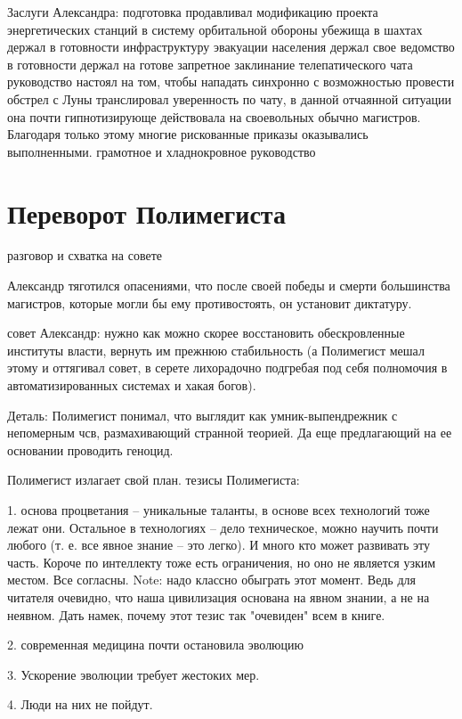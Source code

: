 \documentclass[12pt,a4paper]{article}
\begin{document}
Заслуги Александра:
подготовка
	продавливал модификацию проекта энергетических станций в систему орбитальной обороны
	убежища в шахтах
	держал в готовности инфраструктуру эвакуации населения
	держал свое ведомство в готовности
	держал на готове запретное заклинание телепатического чата
руководство
	настоял на том, чтобы нападать синхронно с возможностью провести обстрел с Луны
	транслировал уверенность по чату, в данной отчаянной ситуации она почти гипнотизирующе действовала на своевольных обычно магистров. Благодаря только этому многие рискованные приказы оказывались выполненными.
	грамотное и хладнокровное руководство
	
	



\section*{Переворот Полимегиста}
разговор и схватка на совете

Александр тяготился опасениями, что после своей победы и смерти большинства магистров, которые могли бы ему противостоять, он установит диктатуру. 

совет
Александр: нужно как можно скорее восстановить обескровленные институты власти, вернуть им прежнюю стабильность (а Полимегист мешал этому и оттягивал совет, в серете лихорадочно подгребая под себя полномочия в автоматизированных системах и хакая богов).

Деталь: Полимегист понимал, что выглядит как умник-выпендрежник с непомерным чсв, размахивающий странной теорией. Да еще предлагающий на ее основании проводить геноцид.

Полимегист излагает свой план.
тезисы Полимегиста:

1. основа процветания -- уникальные таланты, в основе всех технологий тоже лежат они. Остальное в технологиях -- дело техническое, можно научить почти любого (т. е. все явное знание -- это легко). И много кто может развивать эту часть. Короче по интеллекту тоже есть ограничения, но оно не является узким местом. Все согласны. Note: надо классно обыграть этот момент. Ведь для читателя очевидно, что наша цивилизация основана на явном знании, а не на неявном. Дать намек, почему этот тезис так "очевиден" всем в книге.

2. современная медицина почти остановила эволюцию

3. Ускорение эволюции требует жестоких мер.

4. Люди на них не пойдут.
\end{document}
